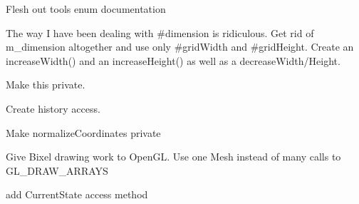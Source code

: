 \begin{DoxyRefList}
Flesh out tools enum documentation  
\item[\label{todo__todo000003}%
\hypertarget{todo__todo000003}{}%
Member \hyperlink{classGLWidget_a603764586aa51ed3fbdd06ac9c658e6b}{G\-L\-Widget\-:\-:increase\-Dimension} ()]The way I have been dealing with \#dimension is ridiculous. Get rid of m\-\_\-dimension altogether and use only \#grid\-Width and \#grid\-Height. Create an increase\-Width() and an increase\-Height() as well as a decrease\-Width/\-Height.  
\item[\label{todo__todo000006}%
\hypertarget{todo__todo000006}{}%
Member \hyperlink{classGLWidget_a7fab13e8cc9fc0730ca54c08b2c923a7}{G\-L\-Widget\-:\-:initialize\-G\-L} ()]Make this private.  
\item[\label{todo__todo000008}%
\hypertarget{todo__todo000008}{}%
Member \hyperlink{classGLWidget_acb2ac0440f3e004a77c31f8b035fb8a4}{G\-L\-Widget\-:\-:load\-History\-State} (int state\-Index)]Create history access.  
\item[\label{todo__todo000009}%
\hypertarget{todo__todo000009}{}%
Member \hyperlink{classGLWidget_ab464e7edbe7729a853d7ccb510d6ef73}{G\-L\-Widget\-:\-:normalize\-Coordinates} (\hyperlink{classvec2}{vec2} coord) const ]Make normalize\-Coordinates private  
\item[\label{todo__todo000007}%
\hypertarget{todo__todo000007}{}%
Member \hyperlink{classGLWidget_a640b5570cb2b37724fd5b58a77339c5e}{G\-L\-Widget\-:\-:paint\-G\-L} ()]Give Bixel drawing work to Open\-G\-L. Use one Mesh instead of many calls to G\-L\-\_\-\-D\-R\-A\-W\-\_\-\-A\-R\-R\-A\-Y\-S  
\item[\label{todo__todo000005}%
\hypertarget{todo__todo000005}{}%
Member \hyperlink{classGLWidget_aed44b9ce42449cf8f086a743bbbac7cd}{G\-L\-Widget\-:\-:undo} ()]add Current\-State access method 
\end{DoxyRefList}